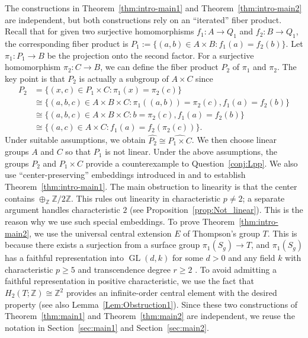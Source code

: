 \documentclass[11pt]{amsart}
\theoremstyle{definition}
\DeclareMathOperator{\GL}{GL}
\newcommand{\ZZ}{\mathbb{Z}}
\begin{document}
 The constructions in Theorem~\ref{thm:intro-main1} and Theorem~\ref{thm:intro-main2} are independent, but both constructions rely on an ``iterated'' fiber product.
 Recall that for given two surjective homomorphisms $f_1:A \to Q_1$ and $f_2:B \to Q_1$, the corresponding fiber product is $P_1:=\{ (a,b) \in A \times B : f_1(a)=f_2(b) \}$.
 Let $\pi_1:P_1 \to B$ be the projection onto the second factor.
 For a surjective homomorphism $\pi_2:C \to B$, we can define the fiber product $P_2$ of $\pi_1$ and $\pi_2$.
 The key point is that $P_2$ is actually a subgroup of $A \times C$ since
 \begin{align*}
 P_2 &= \{ (x,c) \in P_1 \times C : \pi_1(x)=\pi_2(c) \} \\
 & \cong \{ (a,b,c) \in A \times B \times C : \pi_1((a,b))=\pi_2(c), f_1(a)=f_2(b) \} \\
 & \cong \{ (a,b,c) \in A \times B \times C : b=\pi_2(c), f_1(a)=f_2(b) \} \\
 & \cong \{ (a,c) \in A \times C : f_1(a)=f_2(\pi_2(c)) \}.
 \end{align*}
 Under suitable assumptions, we obtain $\widehat{P_2} \cong \widehat{P_1 \times C}$.
We then choose linear groups $A$ and $C$ so that $P_1$ is not linear.
Under the above assumptions, the groups $P_2$ and $P_1 \times C$ provide a counterexample to Question~\ref{conj:Lpp}.
 We also use ``center-preserving'' embeddings introduced in \cite{houcine2007embeddings} and \cite{palmer2025embedding} to establish Theorem~\ref{thm:intro-main1}.
 The main obstruction to linearity is that the center contains $\oplus_\ZZ \ZZ/2 \ZZ$.
 This rules out linearity in characteristic $p \neq 2$; a separate argument handles characteristic $2$ (see Proposition~\ref{prop:Not_linear}).
 This is the reason why we use such special embeddings.
 To prove Theorem~\ref{thm:intro-main2}, we use the universal central extension $E$ of Thompson's group $T$.
 This is because there exists a surjection from a surface group $\pi_1(S_g) \to T$, and $\pi_1(S_g)$ has a faithful representation into $\GL(d,k)$ for some $d>0$ and any field $k$ with characteristic $p \geq 5$ and transcendence degree $r \geq 2$ \cite[Theorem 5]{fisher2018character}.
 To avoid admitting a faithful representation in positive characteristic, we use the fact that $H_2(T;\ZZ) \cong \ZZ^2$ provides an infinite-order central element with the desired property
 (see also Lemma~\ref{Lem:Obstruction1}).
 Since these two constructions of Theorem~\ref{thm:main1} and Theorem~\ref{thm:main2} are independent, we reuse the notation in Section~\ref{sec:main1} and Section~\ref{sec:main2}.
\end{document}

